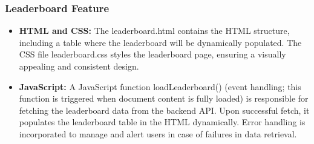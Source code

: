\documentclass[12pt]{article}
\begin{document}
\subsubsection{Leaderboard Feature}
\begin{itemize}
    \item \textbf{HTML and CSS:} The leaderboard.html contains the HTML structure, including a table where the leaderboard will be dynamically populated. The CSS file leaderboard.css styles the leaderboard page, ensuring a visually appealing and consistent design.
    \item \textbf{JavaScript:} A JavaScript function loadLeaderboard() (event handling; this function is triggered when document content is fully loaded) is responsible for fetching the leaderboard data from the backend API. Upon successful fetch, it populates the leaderboard table in the HTML dynamically. Error handling is incorporated to manage and alert users in case of failures in data retrieval.
\end{itemize}
\end{document}
